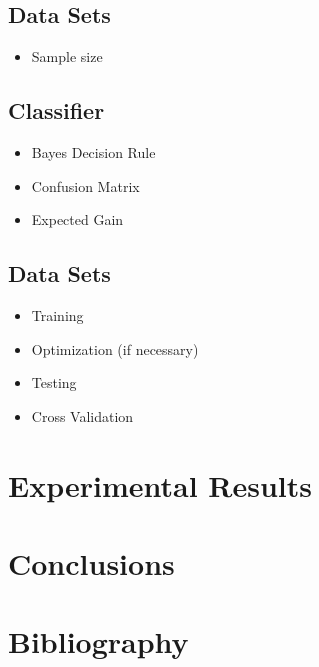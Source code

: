 \documentclass[letterpaper, conference]{IEEEtran}
\begin{document}
\subsection{Data Sets}
\begin{itemize}
\item Sample size
\end{itemize}

\subsection{Classifier}
\begin{itemize}
\item{Bayes Decision Rule}
\item{Confusion Matrix}
\item{Expected Gain}
\end{itemize}

\subsection{Data Sets}
\begin{itemize}
\item Training
\item Optimization (if necessary)
\item Testing
\item Cross Validation
\end{itemize}

\section{Experimental Results}

\section{Conclusions}

\section*{Bibliography}
\end{document}
